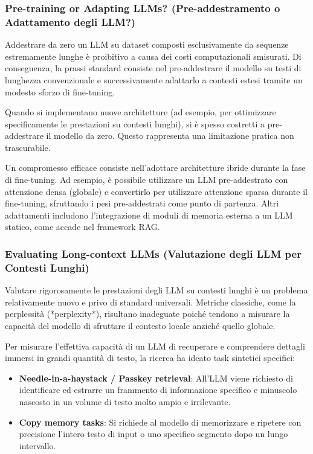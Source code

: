\subsubsection{Pre-training or Adapting LLMs? (Pre-addestramento o Adattamento degli LLM?)}

Addestrare da zero un LLM su dataset composti esclusivamente da sequenze estremamente lunghe è proibitivo a causa dei costi computazionali smisurati. Di conseguenza, la prassi standard consiste nel pre-addestrare il modello su testi di lunghezza convenzionale e successivamente adattarlo a contesti estesi tramite un modesto sforzo di fine-tuning.

\begin{observation}
Quando si implementano nuove architetture (ad esempio, per ottimizzare specificamente le prestazioni su contesti lunghi), si è spesso costretti a pre-addestrare il modello da zero. Questo rappresenta una limitazione pratica non trascurabile.
\end{observation}

Un compromesso efficace consiste nell'adottare architetture ibride durante la fase di fine-tuning. Ad esempio, è possibile utilizzare un LLM pre-addestrato con attenzione densa (globale) e convertirlo per utilizzare attenzione sparsa durante il fine-tuning, sfruttando i pesi pre-addestrati come punto di partenza. Altri adattamenti includono l'integrazione di moduli di memoria esterna a un LLM statico, come accade nel framework RAG.

\subsubsection{Evaluating Long-context LLMs (Valutazione degli LLM per Contesti Lunghi)}

Valutare rigorosamente le prestazioni degli LLM su contesti lunghi è un problema relativamente nuovo e privo di standard universali. Metriche classiche, come la perplessità (*perplexity*), risultano inadeguate poiché tendono a misurare la capacità del modello di sfruttare il contesto locale anziché quello globale.

Per misurare l'effettiva capacità di un LLM di recuperare e comprendere dettagli immersi in grandi quantità di testo, la ricerca ha ideato task sintetici specifici:
\begin{itemize}
\item \textbf{Needle-in-a-haystack / Passkey retrieval}: All'LLM viene richiesto di identificare ed estrarre un frammento di informazione specifico e minuscolo nascosto in un volume di testo molto ampio e irrilevante.
\item \textbf{Copy memory tasks}: Si richiede al modello di memorizzare e ripetere con precisione l'intero testo di input o uno specifico segmento dopo un lungo intervallo.
\end{itemize}

